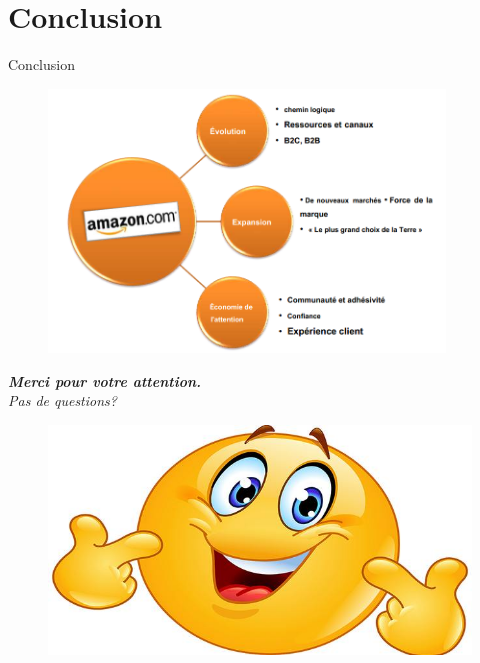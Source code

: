 \section*{Conclusion}
\begin{frame}{Conclusion}
  \begin{figure}
    \vspace{-0.2cm}
    \includegraphics[width=\framewidth,height=7cm]{figures/conclusion.PNG}
	\end{figure}
\end{frame}
\begin{frame}
  \centering \Large
  \emph{
    \textbf{Merci pour votre attention.}\\
    Pas de questions?
    }
    \vspace{0.4cm}
     \begin{figure}
        \includegraphics[scale=0.1]{figures/smile.jpg}
	\end{figure}
\end{frame}